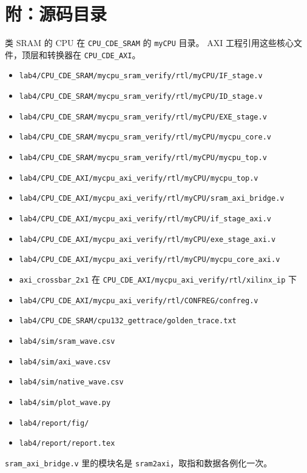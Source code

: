 \documentclass{article}
\begin{document}
\section{附：源码目录}
类 SRAM 的 CPU 在 \texttt{CPU\_CDE\_SRAM} 的 \texttt{myCPU} 目录。
AXI 工程引用这些核心文件，顶层和转换器在 \texttt{CPU\_CDE\_AXI}。
\begin{itemize}
\item \verb|lab4/CPU_CDE_SRAM/mycpu_sram_verify/rtl/myCPU/IF_stage.v|
\item \verb|lab4/CPU_CDE_SRAM/mycpu_sram_verify/rtl/myCPU/ID_stage.v|
\item \verb|lab4/CPU_CDE_SRAM/mycpu_sram_verify/rtl/myCPU/EXE_stage.v|
\item \verb|lab4/CPU_CDE_SRAM/mycpu_sram_verify/rtl/myCPU/mycpu_core.v|
\item \verb|lab4/CPU_CDE_SRAM/mycpu_sram_verify/rtl/myCPU/mycpu_top.v|
\item \verb|lab4/CPU_CDE_AXI/mycpu_axi_verify/rtl/myCPU/mycpu_top.v|
\item \verb|lab4/CPU_CDE_AXI/mycpu_axi_verify/rtl/myCPU/sram_axi_bridge.v|
\item \verb|lab4/CPU_CDE_AXI/mycpu_axi_verify/rtl/myCPU/if_stage_axi.v|
\item \verb|lab4/CPU_CDE_AXI/mycpu_axi_verify/rtl/myCPU/exe_stage_axi.v|
\item \verb|lab4/CPU_CDE_AXI/mycpu_axi_verify/rtl/myCPU/mycpu_core_axi.v|
\item \texttt{axi\_crossbar\_2x1} 在
      \texttt{CPU\_CDE\_AXI/mycpu\_axi\_verify/rtl/xilinx\_ip} 下
\item \verb|lab4/CPU_CDE_AXI/mycpu_axi_verify/rtl/CONFREG/confreg.v|
\item \verb|lab4/CPU_CDE_SRAM/cpu132_gettrace/golden_trace.txt|
\item \verb|lab4/sim/sram_wave.csv|
\item \verb|lab4/sim/axi_wave.csv|
\item \verb|lab4/sim/native_wave.csv|
\item \verb|lab4/sim/plot_wave.py|
\item \verb|lab4/report/fig/|
\item \verb|lab4/report/report.tex|
\end{itemize}
\texttt{sram\_axi\_bridge.v} 里的模块名是 \texttt{sram2axi}，取指和数据各例化一次。
\end{document}
